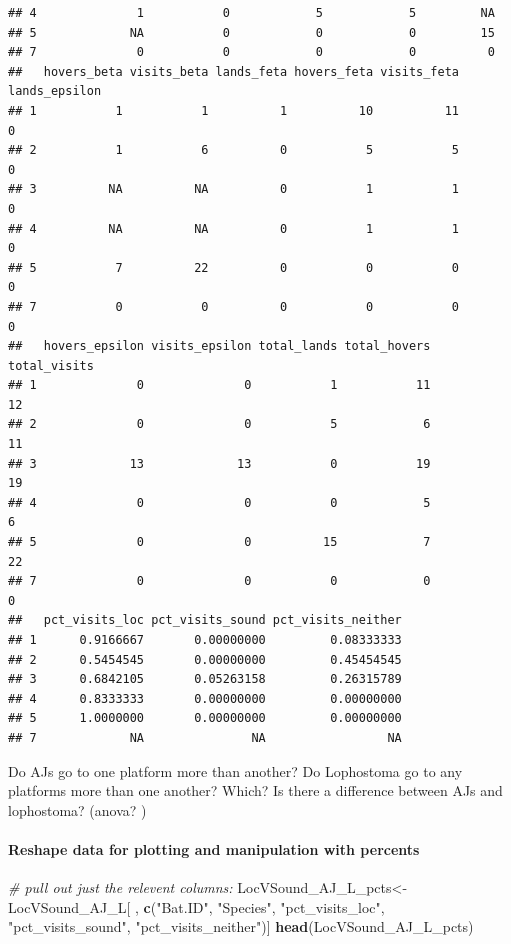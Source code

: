 \documentclass[]{article}
\newenvironment{Shaded}{\begin{snugshade}}{\end{snugshade}}
\newcommand{\KeywordTok}[1]{\textcolor[rgb]{0.13,0.29,0.53}{\textbf{{#1}}}}
\newcommand{\StringTok}[1]{\textcolor[rgb]{0.31,0.60,0.02}{{#1}}}
\newcommand{\CommentTok}[1]{\textcolor[rgb]{0.56,0.35,0.01}{\textit{{#1}}}}
\newcommand{\NormalTok}[1]{{#1}}
\let\oldparagraph\paragraph
\renewcommand{\paragraph}[1]{\oldparagraph{#1}\mbox{}}
\begin{document}
\begin{verbatim}
## 4              1           0            5            5         NA
## 5             NA           0            0            0         15
## 7              0           0            0            0          0
##   hovers_beta visits_beta lands_feta hovers_feta visits_feta lands_epsilon
## 1           1           1          1          10          11             0
## 2           1           6          0           5           5             0
## 3          NA          NA          0           1           1             0
## 4          NA          NA          0           1           1             0
## 5           7          22          0           0           0             0
## 7           0           0          0           0           0             0
##   hovers_epsilon visits_epsilon total_lands total_hovers total_visits
## 1              0              0           1           11           12
## 2              0              0           5            6           11
## 3             13             13           0           19           19
## 4              0              0           0            5            6
## 5              0              0          15            7           22
## 7              0              0           0            0            0
##   pct_visits_loc pct_visits_sound pct_visits_neither
## 1      0.9166667       0.00000000         0.08333333
## 2      0.5454545       0.00000000         0.45454545
## 3      0.6842105       0.05263158         0.26315789
## 4      0.8333333       0.00000000         0.00000000
## 5      1.0000000       0.00000000         0.00000000
## 7             NA               NA                 NA
\end{verbatim}

Do AJs go to one platform more than another? Do Lophostoma go to any
platforms more than one another? Which? Is there a difference between
AJs and lophostoma? (anova? )

\paragraph{Reshape data for plotting and manipulation with
percents}\label{reshape-data-for-plotting-and-manipulation-with-percents}

\begin{Shaded}
\begin{Highlighting}[]
\CommentTok{# pull out just the relevent columns: }
\NormalTok{LocVSound_AJ_L_pcts<-}\StringTok{ }\NormalTok{LocVSound_AJ_L[ , }\KeywordTok{c}\NormalTok{(}\StringTok{"Bat.ID"}\NormalTok{, }\StringTok{"Species"}\NormalTok{, }\StringTok{"pct_visits_loc"}\NormalTok{, }\StringTok{"pct_visits_sound"}\NormalTok{, }\StringTok{"pct_visits_neither"}\NormalTok{)]}
\KeywordTok{head}\NormalTok{(LocVSound_AJ_L_pcts)}
\end{Highlighting}
\end{Shaded}
\end{document}
